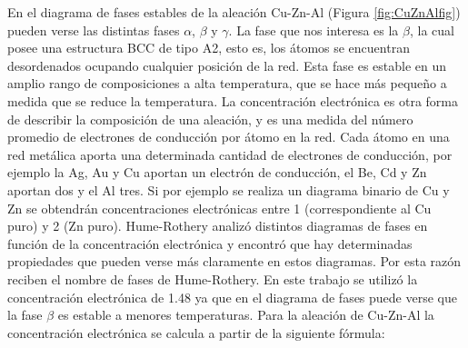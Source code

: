 \documentclass[a4paper,12pt,fleqn,twoside,openany]{book}
\begin{document}

En el diagrama de fases estables de la aleación Cu-Zn-Al (Figura
\ref{fig:CuZnAlfig}) pueden verse las distintas fases $\alpha$,
$\beta$ y $\gamma$. La fase que nos interesa es la $\beta$, la cual
posee una estructura BCC de tipo A2, esto es,
los átomos se encuentran desordenados ocupando cualquier posición de
la red. Esta fase es estable en un amplio rango de composiciones a
alta temperatura, que se hace más pequeño a medida que se reduce la temperatura.
La concentración electrónica es otra forma de describir la
composición de una aleación, y es una medida del número promedio de electrones
de conducción por átomo en la red. Cada átomo en una red metálica
aporta una determinada cantidad de electrones de conducción, por
ejemplo la Ag, Au y Cu aportan un electrón de conducción, el Be, Cd y
Zn aportan dos y el Al tres. Si por ejemplo se realiza un diagrama
binario de Cu y Zn se obtendrán concentraciones electrónicas entre 1
(correspondiente al Cu puro) y
2 (Zn puro). Hume-Rothery analizó distintos diagramas de fases en función de la
concentración electrónica y encontró que hay determinadas
propiedades que pueden verse más claramente en estos diagramas.
Por esta razón reciben el nombre de fases de Hume-Rothery.
En este trabajo se utilizó la concentración electrónica de 1.48 ya que en el
diagrama de fases puede verse que la fase $\beta$ es estable a
menores temperaturas. Para la aleación de Cu-Zn-Al la concentración
electrónica se calcula a partir de la siguiente fórmula:
\end{document}

